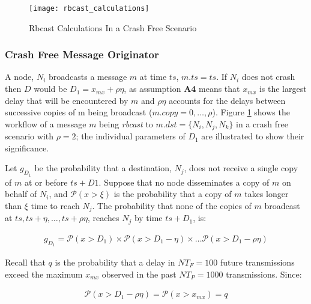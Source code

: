         \begin{figure}[hb]
                \centering    
                \centerline{\texttt{[image: rbcast\_calculations]}}
                \caption[Rbcast Calculations Diagram In a Crash Free Scenario]{Rbcast Calculations In a Crash Free Scenario}
                \label{fig:rbcast_calc}
            \end{figure}    

        \subsubsection*{Crash Free Message Originator}
        A node, $N_i$ broadcasts a message $m$ at time $ts$, $m.ts = ts$.  If $N_i$ does not crash then $D$ would be $D_1 = x_{mx} + \rho\eta$, as assumption \textbf{A4} means that $x_{mx}$ is the largest delay that will be encountered by $m$ and $\rho\eta$ accounts for the delays between successive copies of m being broadcast ($m.copy = 0,\ldots,\rho$).  Figure \ref{fig:rbcast_calc} shows the workflow of a message $m$ being \emph{rbcast} to $m.dst = \{N_i, N_j, N_k\}$ in a crash free scenario with $\rho = 2$; the individual parameters of $D_1$ are illustrated to show their significance.  
        
        Let $g_{D_1}$ be the probability that a destination, $N_j$, does not receive a single copy of $m$ at or before $ts + D1$.  Suppose that no node disseminates a copy of $m$ on behalf of $N_i$, and $\mathcal{P}(x > \xi)$ is the probability that a copy of $m$ takes longer than $\xi$ time to reach $N_{j}$.  The probability that none of the copies of $m$ broadcast at $ts, ts+\eta, \ldots,  ts+\rho \eta$, reaches $N_{j}$ by time $ts+D_1$, is:
        
        \begin{equation*}
            \begin{aligned}
                g_{D_1}= \mathcal{P}(x > D_1) \times \mathcal{P}(x > D_1 - \eta) \times \ldots \mathcal{P}(x > D_1 - \rho \eta)
            \end{aligned}
        \end{equation*}

        
        Recall that $q$ is the probability that a delay in $NT_F=100$ future transmissions exceed the maximum $x_{mx}$ observed in the past $NT_P=1000$ transmissions. Since:
        
        \begin{equation*}
            \begin{aligned}
                \mathcal{P}(x > D_1 - \rho \eta) = \mathcal{P}(x > x_{mx}) = q
            \end{aligned}
        \end{equation*}
        
